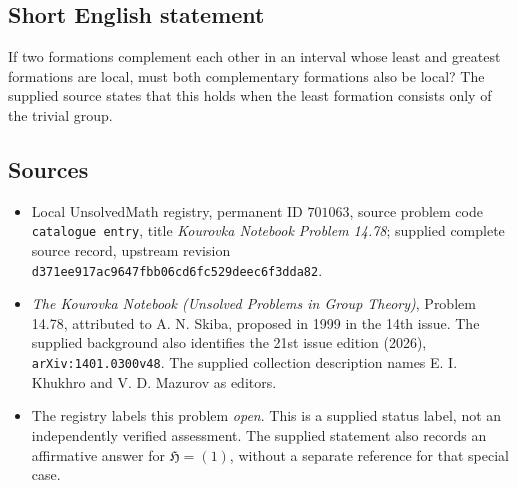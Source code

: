 \documentclass[11pt]{article}
\begin{document}
\subsection{Short English statement}
If two formations complement each other in an interval whose least and greatest formations are local, must both complementary formations also be local? The supplied source states that this holds when the least formation consists only of the trivial group.
\subsection{Sources}
\begin{itemize}
\item Local UnsolvedMath registry, permanent ID \(701063\), source problem code \texttt{catalogue entry}, title \emph{Kourovka Notebook Problem 14.78}; supplied complete source record, upstream revision \texttt{d371ee917ac9647fbb06cd6fc529deec6f3dda82}.
\item \emph{The Kourovka Notebook (Unsolved Problems in Group Theory)}, Problem 14.78, attributed to A. N. Skiba, proposed in 1999 in the 14th issue. The supplied background also identifies the 21st issue edition (2026), \texttt{arXiv:1401.0300v48}. The supplied collection description names E. I. Khukhro and V. D. Mazurov as editors.
\item The registry labels this problem \emph{open}. This is a supplied status label, not an independently verified assessment. The supplied statement also records an affirmative answer for \(\mathfrak H=(1)\), without a separate reference for that special case.
\end{itemize}
\end{document}
